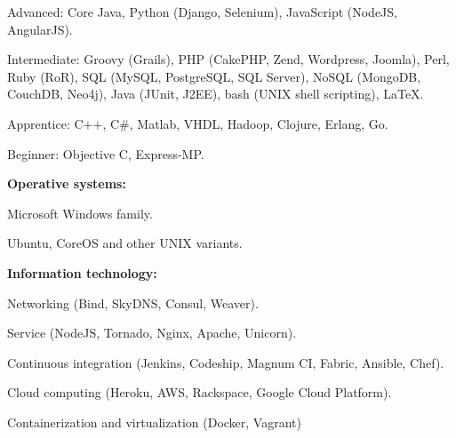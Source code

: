     \begin{innerlist}
\item Advanced: Core Java, Python (Django, Selenium), JavaScript
(NodeJS, AngularJS).
\item Intermediate: Groovy (Grails), PHP
(CakePHP, Zend, Wordpress, Joomla), Perl, Ruby (RoR), SQL (MySQL, PostgreSQL,
SQL Server), NoSQL (MongoDB, CouchDB, Neo4j), 
Java (JUnit, J2EE), bash (UNIX shell scripting), \LaTeX{}.
\item Apprentice: C$+$$+$, C\#, Matlab, VHDL, Hadoop, Clojure,
Erlang, Go.
\item Beginner: Objective C, Express-MP.
    \end{innerlist}

\halfblankline

\textbf{Operative systems:}
    \begin{innerlist}
\item Microsoft Windows family.
\item Ubuntu, CoreOS and other UNIX variants.
    \end{innerlist}

\halfblankline

\textbf{Information technology:} 
    \begin{innerlist}
\item Networking (Bind, SkyDNS, Consul, Weaver).
\item Service (NodeJS, Tornado, Nginx, Apache, Unicorn).
\item Continuous integration (Jenkins, Codeship, Magnum CI,
Fabric, Ansible, Chef).
\item Cloud computing (Heroku, AWS, Rackspace, Google Cloud Platform).
\item Containerization and virtualization (Docker, Vagrant)
    \end{innerlist}

% 
% 
% 


